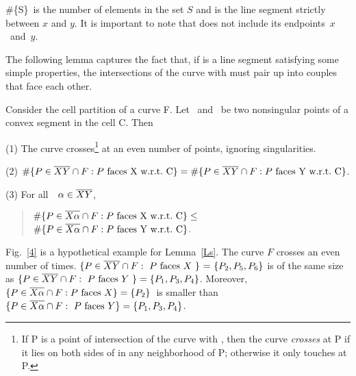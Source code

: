 \begin{notation}
\#\{S\}\ is the number of elements in the set $S$ and
 is the line segment strictly between $x$ and $y$.
It is important to note that 
 does not include its \mbox{endpoints $x$ and $y$}.
\end{notation}

The following lemma captures the fact that, if \seg{\x\y} is a line segment 
satisfying some simple properties, the intersections of the curve with 
\seg{\x\y} must pair up into couples that face each other.

\begin{lemma}
\label{Ls}
Consider the cell partition of a curve F.
Let \x\ and \y\ be two nonsingular points of a convex segment in the cell C.
Then

{\samepage
{\rm (1)} The curve crosses\footnote{If P is a point of intersection of the curve 
	with \seg{\x\y}, then the curve {\em crosses} \seg{\x\y} at P if it lies 
	on both sides of \seg{\x\y} in any neighborhood of P; otherwise it 
	only touches \seg{\x\y} at P.}
\seg{\x\y} at an even number of points, ignoring singularities.

}
{\rm (2)} $\#\{P \in \seg{\x\y} \cap F: P \mbox{ faces \x\ w.r.t.\ C}\} = 
\#\{P \in \seg{\x\y} \cap F: P \mbox{ faces \y\ w.r.t.\ C}\}$.

{\rm (3)} For all\ \ $\alpha \in \mbox{$\overline{XY}$}$,\ \ \nopagebreak 
\begin{quote}
$\#\{P \in\mbox{$\overline{X\alpha}$}\cap F: P \mbox{ faces X\ w.r.t.\ C}\} \leq$
$\#\{P \in \mbox{$\overline{X\alpha}$}\cap F: P \mbox{ faces Y\ w.r.t.\ C}\}$.
\end{quote}
\end{lemma}

\vspace{.2in}

\begin{example}
{\rm 
Fig.~\ref{4} is a hypothetical example for Lemma~\ref{Ls}.
The curve $F$ crosses \seg{\x\y} an even number of times.
$\{ P \in \mbox{$\overline{XY}$} \cap F:\mbox{ $P$ faces $X$\ \} = \{}P_{2},P_{5},P_{6}\}$
is of the same size as 
$\{ P \in \mbox{$\overline{XY}$} \cap F:\mbox{ $P$ faces $Y$ } \} = \{P_{1},P_{3},P_{4}\}$.
Moreover,
$\{ P \in \mbox{$\overline{X\alpha}$} \cap F: \mbox{$P$ faces $X$} \} = \{P_{2}\}$\ 
is smaller than
$\{ P \in \mbox{$\overline{X\alpha}$} \cap F: \mbox{ $P$ faces $Y$} \} = \{P_{1},P_{3},P_{4}\}$.
}
\end{example}
%


